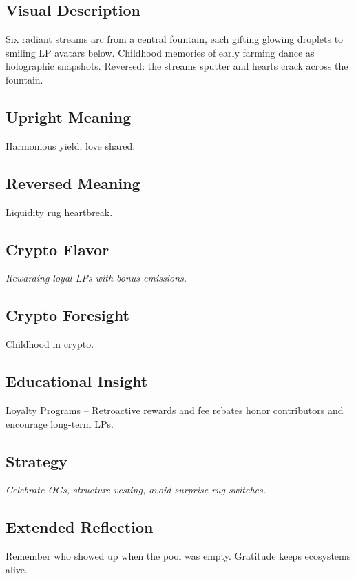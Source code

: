 \documentclass[11pt,oneside]{book}
\begin{document}
\begin{minipage}[t]{0.55\textwidth}
  \vspace{0pt}

  \subsection*{Visual Description}
  Six radiant streams arc from a central fountain, each gifting glowing droplets to smiling LP avatars below. Childhood memories of early farming dance as holographic snapshots. Reversed: the streams sputter and hearts crack across the fountain.

  \subsection*{Upright Meaning}
  Harmonious yield, love shared.

  \subsection*{Reversed Meaning}
  Liquidity rug heartbreak.

  \subsection*{Crypto Flavor}
  \textit{Rewarding loyal LPs with bonus emissions.}

  \subsection*{Crypto Foresight}
  Childhood in crypto.

  \subsection*{Educational Insight}
  Loyalty Programs – Retroactive rewards and fee rebates honor contributors and encourage long-term LPs.

  \subsection*{Strategy}
  \textit{Celebrate OGs, structure vesting, avoid surprise rug switches.}

  \subsection*{Extended Reflection}
  Remember who showed up when the pool was empty. Gratitude keeps ecosystems alive.


\end{minipage}
\end{document}
